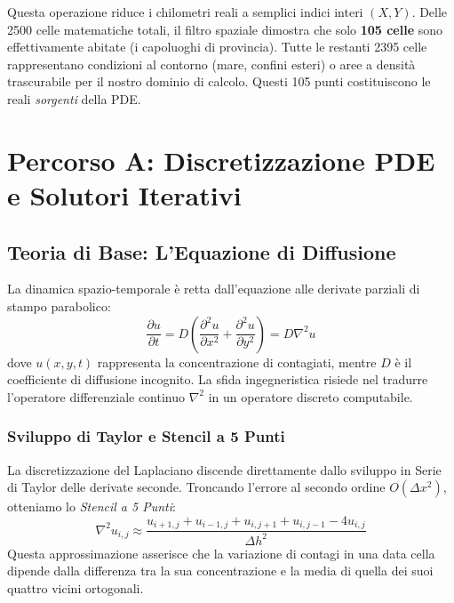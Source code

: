 \documentclass[12pt,a4paper]{report}
\begin{document}
Questa operazione riduce i chilometri reali a semplici indici interi $(X, Y)$. Delle 2500 celle matematiche totali, il filtro spaziale dimostra che solo \textbf{105 celle} sono effettivamente abitate (i capoluoghi di provincia). Tutte le restanti 2395 celle rappresentano condizioni al contorno (mare, confini esteri) o aree a densità trascurabile per il nostro dominio di calcolo. Questi 105 punti costituiscono le reali \textit{sorgenti} della PDE.


\chapter{Percorso A: Discretizzazione PDE e Solutori Iterativi}

\section{Teoria di Base: L'Equazione di Diffusione}
La dinamica spazio-temporale è retta dall'equazione alle derivate parziali di stampo parabolico:
\begin{equation}
\frac{\partial u}{\partial t} = D \left( \frac{\partial^2 u}{\partial x^2} + \frac{\partial^2 u}{\partial y^2} \right) = D \nabla^2 u
\end{equation}
dove $u(x,y,t)$ rappresenta la concentrazione di contagiati, mentre $D$ è il coefficiente di diffusione incognito.
La sfida ingegneristica risiede nel tradurre l'operatore differenziale continuo $\nabla^2$ in un operatore discreto computabile.

\subsection{Sviluppo di Taylor e Stencil a 5 Punti}
La discretizzazione del Laplaciano discende direttamente dallo sviluppo in Serie di Taylor delle derivate seconde. Troncando l'errore al secondo ordine $O(\Delta x^2)$, otteniamo lo \textit{Stencil a 5 Punti}:
\begin{equation}
\nabla^2 u_{i,j} \approx \frac{u_{i+1,j} + u_{i-1,j} + u_{i,j+1} + u_{i,j-1} - 4u_{i,j}}{\Delta h^2}
\end{equation}
Questa approssimazione asserisce che la variazione di contagi in una data cella dipende dalla differenza tra la sua concentrazione e la media di quella dei suoi quattro vicini ortogonali.
\end{document}
